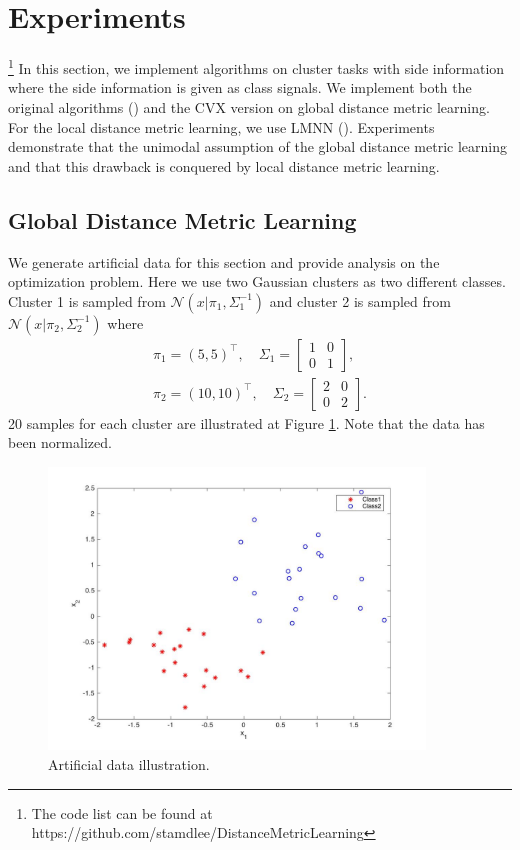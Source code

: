 \documentclass[12pt]{article}
\newcommand\T{^\top}
\newcommand{\twomat}[4]{\begin{bmatrix} #1 & #2 \\ #3 & #4 \end{bmatrix}}
\begin{document}
\section{Experiments}\footnote{The code list can be found at https://github.com/stamdlee/DistanceMetricLearning}
In this section, we implement algorithms on cluster tasks with side information where the side information is given as class signals. We implement both the original algorithms (\citet{xing2003distance}) and the CVX version on global distance metric learning. For the local distance metric learning, we use LMNN (\citet{weinberger2009distance}). Experiments demonstrate that the unimodal assumption of the global distance metric learning and that this drawback is conquered by local distance metric learning.

\subsection{Global Distance Metric Learning}

We generate artificial data for this section and provide analysis on the optimization problem. Here we use two Gaussian clusters as two different classes. Cluster 1 is sampled from $\mathcal{N}(x|\pi_1, \Sigma^{-1}_1)$ and cluster 2 is sampled from $\mathcal{N}(x|\pi_2, \Sigma^{-1}_2)$ where
\begin{align*}
\pi_1 = (5,5)\T,\quad\Sigma_1=\twomat{1}{0}{0}{1},\\
\pi_2 = (10,10)\T,\quad\Sigma_2=\twomat{2}{0}{0}{2}.
\end{align*}
20 samples for each cluster are illustrated at Figure \ref{fig1}. Note that the data has been normalized.
\begin{figure}[h]
\centering
\includegraphics[width=10cm]{fig/data.jpg}
\caption{Artificial data illustration.}
\label{fig1}
\end{figure}
\end{document}
